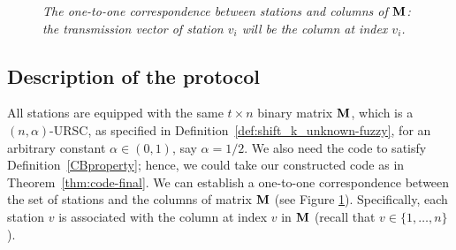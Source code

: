 \documentclass[11pt]{article}
\begin{document}
\begin{figure}[t!]
	\centering
{}
\caption{\textit{The one-to-one correspondence between stations and columns of ${\mathbf M}$:
the transmission vector of station $v_i$ will be the column at index $v_i$. }}
\label{fig:M}	
\end{figure}


\subsection{Description of the protocol}
All stations are equipped with the same $t \times n$ binary matrix ${\mathbf M}$, which is a 
{$(n, \alpha)$-URSC, as specified in Definition~\ref{def:shift_k_unknown-fuzzy}, for an arbitrary constant $\alpha\in (0,1)$, say $\alpha=1/2$.
We also need the code to satisfy Definition~\ref{CBproperty}; hence, we could take our constructed code as in Theorem~\ref{thm:code-final}.}
We can establish a one-to-one correspondence between the set of stations and the columns of 
matrix ${\mathbf M}$ (see Figure \ref{fig:M}). 
Specifically, each station $v$ is associated with the 
column at index $v$ in ${\mathbf M}$ (recall that $v \in \{1,\ldots,n\}$). 
\end{document}
